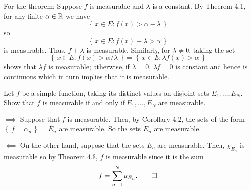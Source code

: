 \begin{solution}
  For the theorem: Suppose $f$ is measurable and $\lambda$ is a
  constant. By Theorem 4.1, for any finite $\alpha\in\mathbb{R}$ we have
  \[
    \left\{\,x\in E:f(x)>\alpha-\lambda\,\right\}
  \]
  so
  \[
    \left\{\,x\in E:f(x)+\lambda>\alpha\,\right\}
  \]
  is measurable. Thus, $f+\lambda$ is measurable. Similarly, for
  $\lambda\neq 0$, taking the set
  \[
    \left\{\,x\in E:f(x)>\alpha/\lambda\,\right\}
    =
    \left\{\,x\in E:\lambda f(x)>\alpha\,\right\}
  \]
  shows that $\lambda f$ is measurable; otherwise, if $\lambda=0$,
  $\lambda f=0$ is constant and hence is continuous which in turn implies
  that it is measurable.
\end{solution}

\begin{problem}
  Let $f$ be a simple function, taking its distinct values on disjoint sets
  $E_1,\ldots,E_N$. Show that $f$ is measurable if and only if
  $E_1,\ldots,E_N$ are measurable.
\end{problem}
\begin{solution}
  $\implies$ Suppose that $f$ is measurable. Then, by Corollary 4.2, the
  sets of the form $\left\{\,f=\alpha_n\,\right\}=E_n$ are measurable. So
  the sets $E_n$ are measurable.

  $\impliedby$ On the other hand, suppose that the sets $E_n$ are
  measurable. Then, $\chi_{E_n}$ is measurable so by Theorem 4.8, $f$ is
  measurable since it is the sum
  \[
    f=\sum_{n=1}^N \alpha_{E_n}.\qedhere
  \]
\end{solution}

